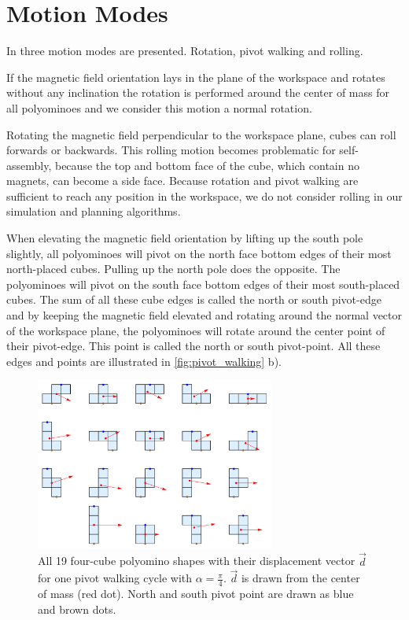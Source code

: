 \section{Motion Modes}
\label{sec:motion}
In \cite{Bhattacharjee2022} three motion modes are presented. Rotation, pivot walking and rolling.

If the magnetic field orientation lays in the plane of the workspace and rotates without any inclination the rotation is performed around the center of mass for all polyominoes and we consider this motion a normal rotation.

Rotating the magnetic field perpendicular to the workspace plane, cubes can roll forwards or backwards.
This rolling motion becomes problematic for self-assembly, because the top and bottom face of the cube, which contain no magnets, can become a side face.
Because rotation and pivot walking are sufficient to reach any position in the workspace, we do not consider rolling in our simulation and planning algorithms.

When elevating the magnetic field orientation by lifting up the south pole slightly, all polyominoes will pivot on the north face bottom edges of their most north-placed cubes.
Pulling up the north pole does the opposite. The polyominoes will pivot on the south face bottom edges of their most south-placed cubes.
The sum of all these cube edges is called the north or south pivot-edge and by keeping the magnetic field elevated and rotating around the normal vector of the workspace plane, the polyominoes will rotate around the center point of their pivot-edge.
This point is called the north or south pivot-point.
All these edges and points are illustrated in \autoref{fig:pivot_walking} b).

\begin{figure}
	\centering
	\includegraphics[width=0.70\textwidth]{figures/displacement_pivot_walking.png}
	\caption[Polyomino shapes with different displacement vectors]{All 19 four-cube polyomino shapes with their displacement vector $\vec{d}$ for one pivot walking cycle with $\alpha = \frac{\pi}{4}$. $\vec{d}$ is drawn from the center of mass (red dot). North and south pivot point are drawn as blue and brown dots.}
	\label{fig:displacement_pivot_walking}
\end{figure}

